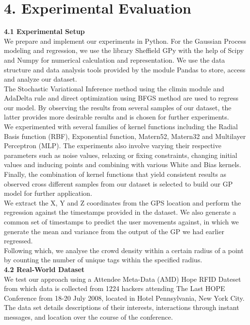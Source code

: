 \documentclass[letterpaper]{article}
\begin{document}
\section{4.  Experimental Evaluation}

{\bf4.1  Experimental Setup} \\

We prepare and implement our experiments in Python. For the Gaussian Process modeling and regression, we use the library Sheffield GPy with the help of Scipy and Numpy for numerical calculation and representation. We use the data structure and data analysis tools provided by the module Pandas to store, access and analyze our dataset. \\

The Stochastic Variational Inference method using the climin module and AdaDelta rule and direct optimization using BFGS method are used to regress our model. By observing the results from several samples of our dataset, the latter provides more desirable results and is chosen for further experiments. \\

We experimented with several families of kernel functions including the Radial Basis function (RBF), Exponential function, Matern52, Matern32 and Multilayer Perceptron (MLP). The experiments also involve varying their respective parameters such as noise values, relaxing or fixing constraints, changing initial values and inducing points and combining with various White and Bias kernels. Finally, the combination of kernel functions that yield consistent results as observed cross different samples from our dataset is selected to build our GP model for further application. \\

We extract the X, Y and Z coordinates from the GPS location and perform the regression against the timestamps provided in the dataset. We also generate a common set of timestamps to predict the user movements against, in which we generate the mean and variance from the output of the GP we had earlier regressed. \\

Following which, we analyse the crowd density within a certain radius of a point by counting the number of unique tags within the specified radius. \\  

{\bf4.2  Real-World Dataset} \\

We test our approach using a Attendee Meta-Data (AMD) Hope RFID Dateset from which data is collected from 1224 hackers attending The Last HOPE Conference from 18-20 July 2008, located in Hotel Pennsylvania, New York City. The data set details descriptions of their interests, interactions through instant messages, and location over the course of the conference. \\
\end{document}
